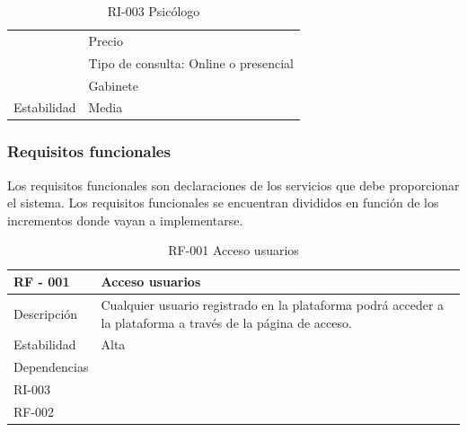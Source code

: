 \begin{table}[htpb]
\begin{tabularx}{\textwidth}{|l|X|}
                   & Precio                                                                       \\ 
                   & Tipo de consulta: Online o presencial                                        \\
                   & Gabinete                                                                     \\ \hline
Estabilidad        & Media                                                                        \\ \hline
\end{tabularx}
\caption{RI-003 Psicólogo}
\end{table}


\subsubsection{Requisitos funcionales}


Los requisitos funcionales son declaraciones de los servicios que debe proporcionar el sistema. Los requisitos funcionales se encuentran divididos en función de los incrementos donde vayan a implementarse\cite{sommerville}.




\begin{table}[htpb]
\centering
\begin{tabularx}{\textwidth}{|l|X|}
\hline
RF - 001                                & Acceso usuarios                                                                                              \\ \hline
Descripción                             & Cualquier usuario registrado en la plataforma podrá acceder a la plataforma a través de la página de acceso. \\ \hline
Estabilidad                             & Alta                                                                                                         \\ \hline
Dependencias & \begin{tabular}[c]{@{}l@{}}RI-001 \\ RI-003 \\ RF-002\end{tabular}                                           \\ \hline
\end{tabularx}
\caption{RF-001 Acceso usuarios}
\end{table}


